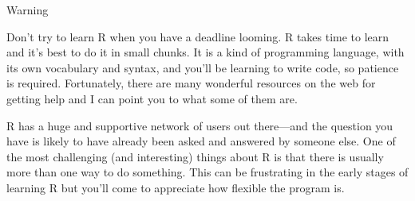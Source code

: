 \documentclass[10pt, a4paper]{article}   	%
\begin{document}
\begin{labeling}{Warning}
	\item [Warning] Don't try to learn R when you have a deadline looming. R takes time to learn and it's best to do it in small chunks. It is a kind of programming language, with its own vocabulary and syntax, and you'll be learning to write code, so patience is required. Fortunately, there are many wonderful resources on the web for getting help and I can point you to what some of them are. 
	
	R has a huge and supportive network of users out there---and the question you have is likely to have already been asked and answered by someone else. One of the most challenging (and interesting) things about R is that there is usually more than one way to do something. This can be frustrating in the early stages of learning R but you'll come to appreciate how flexible the program is. 
\end{labeling}
\end{document}
